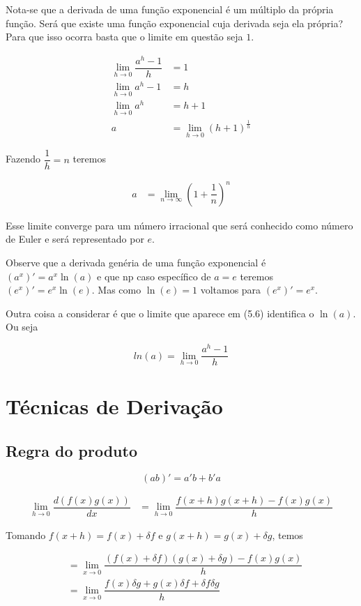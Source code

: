 Nota-se que a derivada de uma função exponencial é um múltiplo da própria função. Será que existe uma função exponencial cuja derivada seja ela própria? Para que isso ocorra basta que o limite em questão seja $1$.

\begin{equation}\label{5.4}
\begin{split}
\lim_{h \to 0}\dfrac{a^h-1}{h}&=1\\
\lim_{h \to 0}a^h-1&=h\\
\lim_{h \to 0}a^h&=h+1\\
a&=\lim_{h \to 0}(h+1)^{\frac{1}{h}}
\end{split}
\end{equation}

Fazendo $\dfrac{1}{h}=n$ teremos

\begin{align}\label{5.5}
a&=\lim_{n\to\infty}\left(1+\dfrac{1}{n}\right)^n
\end{align}

Esse limite converge para um número irracional que será conhecido como número de Euler e será representado por $e$.

Observe que a derivada genéria de uma função exponencial é $(a^x)'=a^x \ln (a)$ e que np caso específico de $a=e$ teremos $(e^x)'=e^x\ln(e)$. Mas como $\ln(e)=1$ voltamos para $(e^x)'=e^x$.

Outra coisa a considerar é que o limite que aparece em (5.6) identifica o $\ln(a)$. Ou seja

$$ln(a)=\lim_{h \to 0}\dfrac{a^h-1}{h}$$

\section{Técnicas de Derivação}

\subsection{Regra do produto}
$$(ab)'=a'b + b'a$$


\begin{align}\label{5.6}
    \lim_{h \rightarrow 0} \dfrac{d (f(x)g(x))}{dx}&=\lim_{h\rightarrow 0} \dfrac{f(x+h)g(x+h)-f(x)g(x)}{h}
\end{align}

Tomando $f(x+h)=f(x)+\delta f$ e $g(x+h)=g(x)+\delta g$, temos

\begin{equation}\label{5.7}
\begin{split}
&=\lim_{x\rightarrow 0} \dfrac{(f(x)+\delta f)(g(x)+\delta g)-f(x)g(x)}{h}\\
&=\lim_{x\rightarrow 0} \dfrac{f(x)\delta g +g(x)\delta f + \delta f \delta g}{h}
\end{split}
\end{equation}

